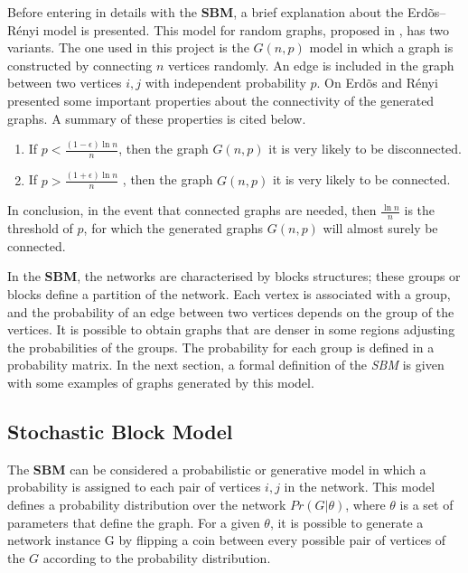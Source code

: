 Before entering in details with the \textbf{SBM}, a brief explanation about the Erd\~os--R\'enyi model is presented. This model for random graphs, proposed in \cite{erdds1959random}, has two variants. The one used in this project is the $G(n, p)$ model in which a graph is constructed by connecting $n$ vertices randomly. An edge is included in the graph between two vertices $i,j$ with independent probability $p$. On \cite{erdos1960evolution} Erd\~os and R\'enyi presented some important properties about the connectivity of the generated graphs. A summary of these properties is cited below.


\begin{enumerate}
\item If $p<{\tfrac {(1-\epsilon )\ln n}{n}}$, then the graph $G(n, p)$ it is very likely to be disconnected.
\item If $p>{\tfrac {(1+\epsilon )\ln n}{n}}$ , then the graph $G(n, p)$ it is very likely to be connected.
\end{enumerate}

In conclusion, in the event that connected graphs are needed, then ${\tfrac {\ln n}{n}}$ is the threshold of $p$, for which the generated graphs $G(n, p)$ will almost surely be connected.  

In the \textbf{SBM}, the networks are characterised by blocks structures; these groups or blocks define a partition of the network. Each vertex is associated with a group, and the probability of an edge between two vertices depends on the group of the vertices. It is possible to obtain graphs that are denser in some regions adjusting the probabilities of the groups. The probability for each group is defined in a probability matrix. In the next section, a formal definition of the \textit{SBM} is given with some examples of graphs generated by this model.


\subsection{Stochastic Block Model}

The \textbf{SBM} can be considered a probabilistic or generative model in which a probability is assigned to each pair of vertices $i,j$ in the network. This model defines a probability distribution over the network $Pr(G | \theta)$, where $\theta$ is a set of parameters that define the graph. For a given $\theta$, it is possible to generate a network instance G by flipping a coin between every possible pair of vertices of the $G$ according to the probability distribution. 

